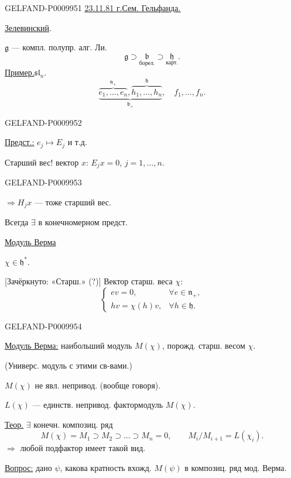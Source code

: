 \begin{GelfandAdjacentEvidence}{GELFAND-P000995}{1}
\underline{23.11.81 г.}\qquad\underline{\underline{Сем. Гельфанда.}}

\underline{Зелевинский}.

$\mathfrak g$ --- компл. полупр. алг. Ли.
\[
\mathfrak g\supset
\underset{\text{борел.}}{\mathfrak b}\supset
\underset{\text{карт.}}{\mathfrak h}.
\]
\underline{Пример.}\quad $\mathfrak{sl}_n$.
\[
\underbrace{
 \overbrace{e_1,\ldots,e_n}^{\mathfrak n_+},
 \overbrace{h_1,\ldots,h_n}^{\mathfrak h}
}_{\mathfrak b_+},
\quad f_1,\ldots,f_n.
\]
\end{GelfandAdjacentEvidence}
\begin{GelfandAdjacentEvidence}{GELFAND-P000995}{2}


\underline{Предст.:} $e_j\mapsto E_j$ и т.д.

Старший вес! вектор $x$: $E_jx=0$, $j=1,\ldots,n$.
\end{GelfandAdjacentEvidence}
\begin{GelfandAdjacentEvidence}{GELFAND-P000995}{3}


$\Rightarrow H_jx$ --- тоже старший вес.

Всегда $\exists$ в конечномерном предст.

\underline{Модуль Верма}

$\chi\in\mathfrak h^*$.

[Зачёркнуто: «Старш.» (?)] Вектор старш. веса $\chi$:
\[
\begin{cases}
ev=0,&\forall e\in\mathfrak n_+,\\
hv=\chi(h)v,&\forall h\in\mathfrak h.
\end{cases}
\]
\end{GelfandAdjacentEvidence}
\begin{GelfandAdjacentEvidence}{GELFAND-P000995}{4}


\underline{Модуль Верма:} наибольший модуль $M(\chi)$, порожд. старш. весом $\chi$.

(Универс. модуль с этими св-вами.)

$M(\chi)$ не явл. непривод. (вообще говоря).

$L(\chi)$ --- единств. непривод. фактормодуль $M(\chi)$.

\underline{Теор.} $\exists$ конечн. композиц. ряд
\[
M(\chi)=M_1\supset M_2\supset\ldots\supset M_n=0,
\qquad M_i/M_{i+1}=L(\chi_i).
\]
$\Rightarrow$ любой подфактор имеет такой вид.

\underline{Вопрос:} дано $\psi$, какова кратность вхожд. $M(\psi)$ в композиц. ряд мод. Верма.
\end{GelfandAdjacentEvidence}
